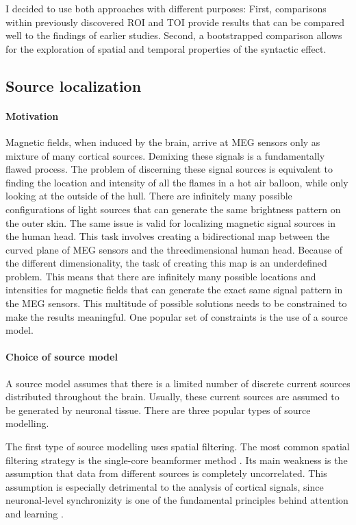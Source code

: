 I decided to use both approaches with different purposes:
First, comparisons within previously discovered ROI and TOI provide results that can be compared well to the findings of earlier studies.
Second, a bootstrapped comparison allows for the exploration of spatial and temporal properties of the syntactic effect.

\subsection{Source localization}

\paragraph{Motivation}
Magnetic fields, when induced by the brain, arrive at MEG sensors only as mixture of many cortical sources.
Demixing these signals is a fundamentally flawed process.
The problem of discerning these signal sources is equivalent to finding the location and intensity of all the flames in a hot air balloon, while only looking at the outside of the hull.
There are infinitely many possible configurations of light sources that can generate the same brightness pattern on the outer skin.
The same issue is valid for localizing magnetic signal sources in the human head.
This task involves creating a bidirectional map between the curved plane of MEG sensors and the threedimensional human head.
Because of the different dimensionality, the task of creating this map is an underdefined problem.
This means that there are infinitely many possible locations and intensities for magnetic fields that can generate the exact same signal pattern in the MEG sensors.
This multitude of possible solutions needs to be constrained to make the results meaningful.
One popular set of constraints is the use of a source model.

\paragraph{Choice of source model}
A source model assumes that there is a limited number of discrete current sources distributed throughout the brain.
Usually, these current sources are assumed to be generated by neuronal tissue.
There are three popular types of source modelling.

The first type of source modelling uses spatial filtering.
The most common spatial filtering strategy is the single-core beamformer method \cite{1.5.Beamformer-a, 1.5.Beamformer-b}.
Its main weakness is the assumption that data from different sources is completely uncorrelated.
This assumption is especially detrimental to the analysis of cortical signals, since neuronal-level synchronizity is one of the fundamental principles behind attention and learning \cite{1.5.synchronizity}.

